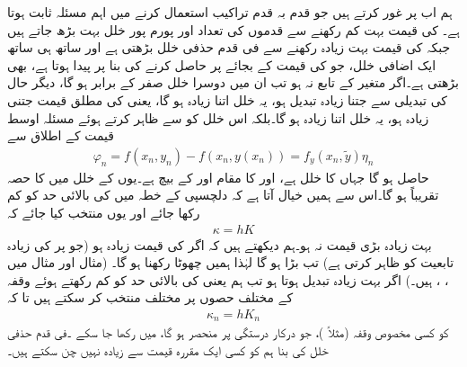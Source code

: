 ہم اب  پر غور کرتے ہیں جو قدم بہ قدم تراکیب استعمال کرنے میں اہم مسئلہ ثابت ہوتا ہے۔ کی قیمت بہت کم رکھنے سے قدموں کی تعداد اور  پورم پور خلل بہت بڑھ جاتے ہیں جبکہ  کی قیمت بہت زیادہ رکھنے سے  فی قدم حذفی خلل بڑھتی ہے اور ساتھ ہی ساتھ ایک اضافی خلل، جو  کی قیمت  کے بجائے  پر حاصل کرنے کی بنا پر  پیدا ہوتا ہے، بھی بڑھتی  ہے۔اگر  متغیر  کے تابع نہ ہو تب ان میں دوسرا خلل صفر کے برابر ہو گا، دیگر حال  کی تبدیلی سے  جتنا زیادہ تبدیل ہو، یہ خلل اتنا زیادہ ہو گا، یعنی  کی مطلق قیمت جتنی زیادہ ہو، یہ خلل اتنا زیادہ ہو گا۔بلکہ اس خلل کو  سے ظاہر کرتے ہوئے مسئلہ اوسط قیمت کے اطلاق سے 
\begin{align*}
\varphi_n=f(x_n,y_n)-f(x_n,y(x_n))=f_y(x_n,\tilde{y})\eta_n
\end{align*}
حاصل ہو گا جہاں   کا خلل  ہے، اور  کا مقام    اور  کے بیچ ہے۔یوں  کے خلل میں  کا حصہ تقریباً  ہو گا۔اس سے ہمیں خیال آتا ہے کہ دلچسپی کے خطہ میں  کی بالائی حد  کو کم رکھا جائے اور  یوں منتخب کیا جائے کہ
\begin{align*}
\kappa=hK
\end{align*}
بہت زیادہ بڑی قیمت نہ ہو۔ہم دیکھتے ہیں کہ اگر  کی قیمت زیادہ ہو (جو  پر  کی زیادہ تابعیت کو ظاہر کرتی ہے) تب  بڑا ہو گا لہٰذا ہمیں  چھوٹا رکھنا ہو گا۔ (مثال  اور مثال  میں ، ،  ہیں۔) اگر  بہت زیادہ تبدیل ہوتا ہو تب ہم  یعنی  کی بالائی حد کو کم رکھتے ہوئے وقفہ کے مختلف حصوں پر مختلف  منتخب کر سکتے ہیں تا کہ 
\begin{align*}
\kappa_n=hK_n
\end{align*}
کو کسی مخصوص  وقفہ (مثلاً )، جو  درکار درستگی پر منحصر ہو گا،  میں رکھا جا سکے ۔فی قدم حذفی خلل کی بنا ہم  کو کسی ایک مقررہ  قیمت سے زیادہ نہیں چن سکتے ہیں۔

